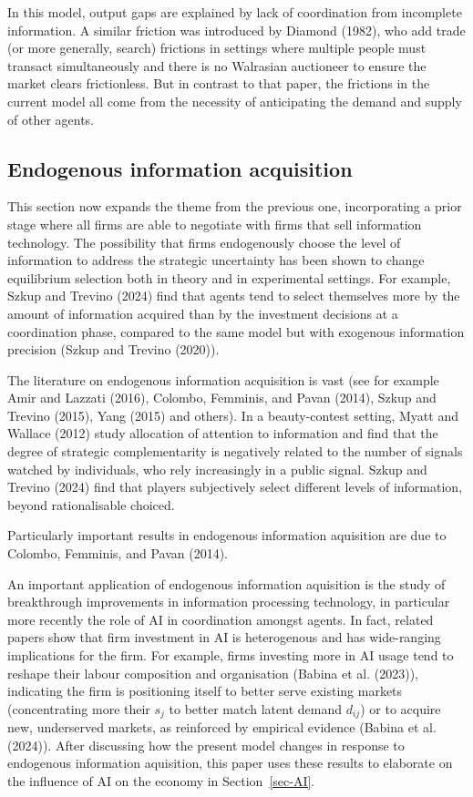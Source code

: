 \documentclass[
]{article}
\theoremstyle{definition}
\theoremstyle{plain}
\theoremstyle{remark}
\begin{document}
In this model, output gaps are explained by lack of coordination from
incomplete information. A similar friction was introduced by Diamond
(1982), who add trade (or more generally, search) frictions in settings
where multiple people must transact simultaneously and there is no
Walrasian auctioneer to ensure the market clears frictionless. But in
contrast to that paper, the frictions in the current model all come from
the necessity of anticipating the demand and supply of other agents.

\subsection{Endogenous information
acquisition}\label{endogenous-information-acquisition-1}

This section now expands the theme from the previous one, incorporating
a prior stage where all firms are able to negotiate with firms that sell
information technology. The possibility that firms endogenously choose
the level of information to address the strategic uncertainty has been
shown to change equilibrium selection both in theory and in experimental
settings. For example, Szkup and Trevino (2024) find that agents tend to
select themselves more by the amount of information acquired than by the
investment decisions at a coordination phase, compared to the same model
but with exogenous information precision (Szkup and Trevino (2020)).

The literature on endogenous information acquisition is vast (see for
example Amir and Lazzati (2016), Colombo, Femminis, and Pavan (2014),
Szkup and Trevino (2015), Yang (2015) and others). In a beauty-contest
setting, Myatt and Wallace (2012) study allocation of attention to
information and find that the degree of strategic complementarity is
negatively related to the number of signals watched by individuals, who
rely increasingly in a public signal. Szkup and Trevino (2024) find that
players subjectively select different levels of information, beyond
rationalisable choiced.

Particularly important results in endogenous information aquisition are
due to Colombo, Femminis, and Pavan (2014).

An important application of endogenous information aquisition is the
study of breakthrough improvements in information processing technology,
in particular more recently the role of AI in coordination amongst
agents. In fact, related papers show that firm investment in AI is
heterogenous and has wide-ranging implications for the firm. For
example, firms investing more in AI usage tend to reshape their labour
composition and organisation (Babina et al. (2023)), indicating the firm
is positioning itself to better serve existing markets (concentrating
more their \(s_j\) to better match latent demand \(d_{ij}\)) or to
acquire new, underserved markets, as reinforced by empirical evidence
(Babina et al. (2024)). After discussing how the present model changes
in response to endogenous information aquisition, this paper uses these
results to elaborate on the influence of AI on the economy in
Section~\ref{sec-AI}.
\end{document}
